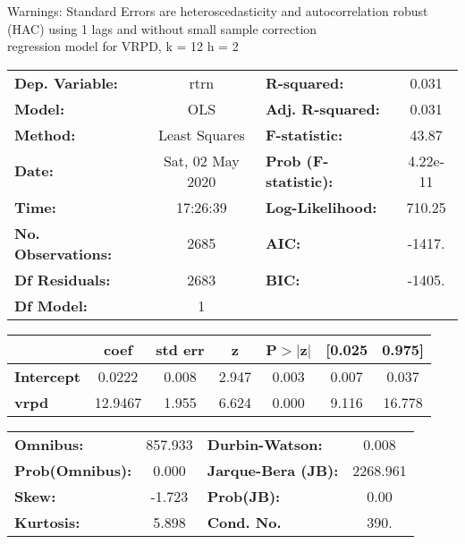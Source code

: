 Warnings: \newline
 [1] Standard Errors are heteroscedasticity and autocorrelation robust (HAC) using 1 lags and without small sample correction\\ 

regression model for VRPD, k = 12 h = 2\begin{center}
\begin{tabular}{lclc}
\toprule
\textbf{Dep. Variable:}    &       rtrn       & \textbf{  R-squared:         } &     0.031   \\
\textbf{Model:}            &       OLS        & \textbf{  Adj. R-squared:    } &     0.031   \\
\textbf{Method:}           &  Least Squares   & \textbf{  F-statistic:       } &     43.87   \\
\textbf{Date:}             & Sat, 02 May 2020 & \textbf{  Prob (F-statistic):} &  4.22e-11   \\
\textbf{Time:}             &     17:26:39     & \textbf{  Log-Likelihood:    } &    710.25   \\
\textbf{No. Observations:} &        2685      & \textbf{  AIC:               } &    -1417.   \\
\textbf{Df Residuals:}     &        2683      & \textbf{  BIC:               } &    -1405.   \\
\textbf{Df Model:}         &           1      & \textbf{                     } &             \\
\bottomrule
\end{tabular}
\begin{tabular}{lcccccc}
                   & \textbf{coef} & \textbf{std err} & \textbf{z} & \textbf{P$> |$z$|$} & \textbf{[0.025} & \textbf{0.975]}  \\
\midrule
\textbf{Intercept} &       0.0222  &        0.008     &     2.947  &         0.003        &        0.007    &        0.037     \\
\textbf{vrpd}      &      12.9467  &        1.955     &     6.624  &         0.000        &        9.116    &       16.778     \\
\bottomrule
\end{tabular}
\begin{tabular}{lclc}
\textbf{Omnibus:}       & 857.933 & \textbf{  Durbin-Watson:     } &    0.008  \\
\textbf{Prob(Omnibus):} &   0.000 & \textbf{  Jarque-Bera (JB):  } & 2268.961  \\
\textbf{Skew:}          &  -1.723 & \textbf{  Prob(JB):          } &     0.00  \\
\textbf{Kurtosis:}      &   5.898 & \textbf{  Cond. No.          } &     390.  \\
\bottomrule
\end{tabular}
\end{center}

